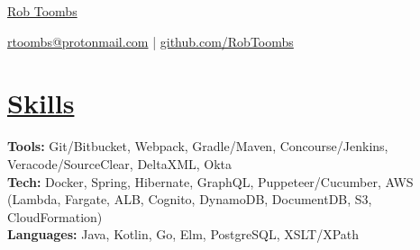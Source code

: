 \documentclass[10pt,letterpaper]{article}
\begin{document}

\centerline{\Huge \href{https://www.reddit.com/r/EngineeringResumes/wiki/index}{Rob Toombs}}

\vspace{5pt}


\centerline{\href{https://www.reddit.com/r/EngineeringResumes/wiki/index\#wiki_contact_information}{rtoombs@protonmail.com} | \href{https://www.reddit.com/r/EngineeringResumes/wiki/index\#wiki_portfolios}{github.com/RobToombs}}

\vspace{-10pt}


\section*{\href{https://www.reddit.com/r/EngineeringResumes/wiki/index\#wiki_skills}{Skills}}
\textbf{Tools:} Git/Bitbucket, Webpack, Gradle/Maven, Concourse/Jenkins, Veracode/SourceClear, DeltaXML, Okta \\
\textbf{Tech:} Docker, Spring, Hibernate, GraphQL, Puppeteer/Cucumber, AWS (Lambda, Fargate, ALB, Cognito, DynamoDB, DocumentDB, S3, CloudFormation)  \\
\textbf{Languages:} Java, Kotlin, Go, Elm, PostgreSQL, XSLT/XPath

\vspace{-6.5pt}

\end{document}
